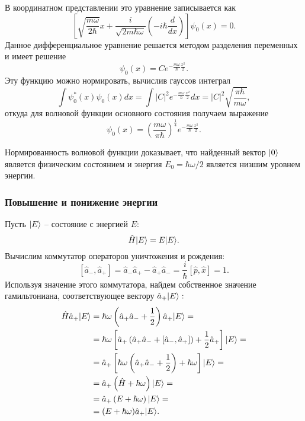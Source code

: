 \documentclass[b5paper]{book}
\DeclarePairedDelimiter\ket{\lvert}{\rangle}
\begin{document}
В координатном представлении это уравнение записывается как
$$\left[\sqrt{\frac{m\omega}{2\hbar}} x + \frac{i}{\sqrt{2m \hbar \omega}}
\left(-i \hbar \frac {d}{dx} \right)
\right] \psi_0(x) = 0.$$
Данное дифференциальное уравнение решается методом разделения переменных и имеет решение
$$\psi_0(x) = C e^{-\frac{m\omega}{\hbar}\frac{x^2}{2}}.$$
Эту функцию можно нормировать, вычислив гауссов интеграл
$$\int \psi_0^*(x) \psi_0(x) dx = \int |C|^2 e^{-\frac{m\omega}{\hbar}\frac{x^2}{2}} dx=
|C|^2 \sqrt{\frac{\pi \hbar}{m \omega}},$$
откуда для волновой функции основного состояния получаем выражение
\begin{equation}\label{osc-ground-state}
 \psi_0(x) = \left(\frac{m\omega}{\pi \hbar}\right)^{\frac 1 4} e^{-\frac{m\omega}{\hbar} \frac{x^2}{2}}.
\end{equation}

Нормированность волновой функции доказывает, что найденный вектор $\ket{0}$ является физическим
состоянием и энергия $E_0 = \hbar \omega / 2$ является низшим уровнем энергии.

\subsubsection*{Повышение и понижение энергии}

Пусть $\ket{E}$ -- состояние с энергией $E:$
$$\hat H \ket{E} = E \ket{E}.$$
Вычислим коммутатор операторов уничтожения и рождения:
$$[\hat a_{-}, \hat a_{+}] = \hat a_{-} \hat a_{+} - \hat a_{+} \hat a_{-} = \frac {i} {\hbar} [\hat p, \hat x] = 1.$$
Используя значение этого коммутатора, найдем собственное значение гамильтониана, соответствующее вектору
$\hat a_{+} \ket {E}:$
\begin{equation}
\begin{aligned}
 \hat H \hat a_{+} \ket{E} &=
 \hbar\omega\left(\hat a_{+} \hat a_{-} + \frac 1 2\right) \hat a_{+} \ket{E} =\\
 &= \hbar\omega \left[\hat a_{+} \left(\hat a_{+} \hat a_{-} + [\hat a_{-}, \hat a_{+}]\right)
    + \frac 1 2 \hat a_{+}\right] \ket{E} =\\
 &= \hat a_{+} \left[\hbar\omega \left(\hat a_{+} \hat a_{-} + \frac 1 2\right) + \hbar \omega\right] \ket{E} =\\
 &= \hat a_{+} \left(\hat H + \hbar \omega\right) \ket{E} =\\
 &= \hat a_{+} \left(E + \hbar \omega\right) \ket{E} =\\
 &= (E + \hbar\omega) \hat a_{+} \ket{E}.
\end{aligned}
\end{equation}
\end{document}
